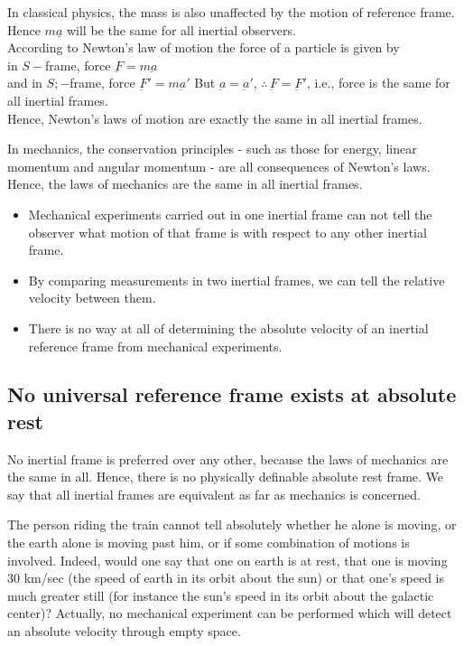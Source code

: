 \documentclass[../main-sheet.tex]{subfiles}
\begin{document}
In classical physics, the mass is also unaffected by the motion of reference frame.\\
Hence \(m\underline{a }\) will be the same for all inertial observers.\\
According to Newton's law of motion the force of a particle is given by \\
in \(S- \)frame, force \(\underbar{F }=m\underbar{a}\)\\
and in \(S;- \)frame, force \(\underbar{F }'=m\underbar{a}'\)
But \(\underbar{a }=\underbar{a }'\), \(\therefore\,\underbar{F }=\underbar{F }'\), i.e., force is the same for all inertial frames.\\
Hence, Newton's laws of motion are exactly the same in all inertial frames.


In mechanics, the conservation principles - such as those for energy, linear momentum and angular momentum - are all consequences of Newton's laws. Hence, the laws of mechanics are the same in all inertial frames.
\begin{itemize}
    \item Mechanical experiments carried out in one inertial frame can not tell the observer what motion of that frame is with respect to any other inertial frame.
    \item By comparing measurements in two inertial frames, we can tell the relative velocity between them.
    \item There is no way at all of determining the absolute velocity of an inertial reference frame from mechanical experiments.
\end{itemize}
\subsection{No universal reference frame exists at absolute rest }
No inertial frame is preferred over any other, because the laws of mechanics are the same in all. Hence, there is no physically definable absolute rest frame. We say that all inertial frames are equivalent as far as mechanics is concerned.

The person riding the train cannot tell absolutely whether he alone is moving, or the earth alone is moving past him, or if some combination of motions is involved. Indeed, would one say that one on earth is at rest, that one is moving 30 km/sec (the speed of earth in its orbit about the sun) or that one's speed is much greater still (for instance the sun's speed in its orbit about the galactic center)? Actually, no mechanical experiment can be performed which will detect an absolute velocity through empty space.
\end{document}
